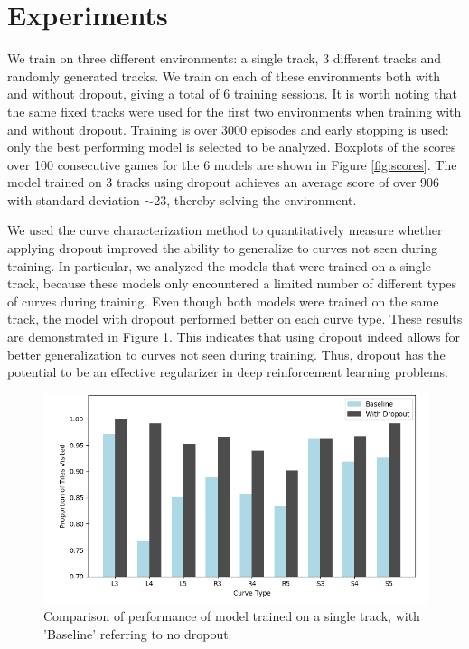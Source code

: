 \documentclass{article}
\begin{document}
\section{Experiments}

We train on three different environments: a single track, 3 different tracks and randomly generated tracks. We train on each of these environments both with and without dropout, giving a total of 6 training sessions. It is worth noting that the same fixed tracks were used for the first two environments when training with and without dropout. Training is over 3000 episodes and early stopping is used: only the best performing model is selected to be analyzed. Boxplots of the scores over 100 consecutive games for the 6 models are shown in Figure \ref{fig:scores}. The model trained on 3 tracks using dropout achieves an average score of over 906 with standard deviation $\sim$23, thereby solving the environment. 
\par

We used the curve characterization method to quantitatively measure whether applying dropout improved the ability to generalize to curves  not seen during training. In particular, we analyzed the models that were trained on a single track, because these models only encountered a limited number of different types of curves during training. Even though both models were trained on the same track, the model with dropout performed better on each curve type. These results are demonstrated in Figure \ref{fig:curves_comparison}. This indicates that using dropout indeed allows for better generalization to curves not seen during training. Thus, dropout has the potential to be an effective regularizer in deep reinforcement learning problems.

\begin{figure}[!h]
\centering
\includegraphics[width=\linewidth]{Graphics/curves_comparison_notitle.png}
\caption{Comparison of performance of model trained on a single track, with 'Baseline' referring to no dropout. }
\label{fig:curves_comparison}
\end{figure}
\end{document}
